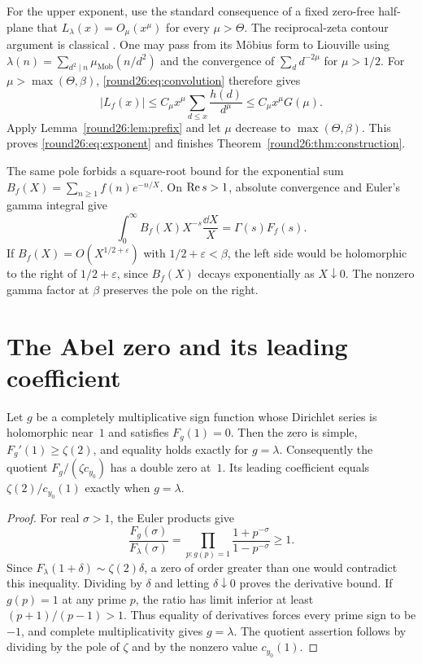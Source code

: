 For the upper exponent, use the standard consequence of a fixed
zero-free half-plane that $L_\lambda(x)=O_\mu(x^\mu)$ for every
$\mu>\Theta$. The reciprocal-zeta contour argument is classical
\cite[Ch.~XIV]{titchmarsh}. One may pass from its M\"obius form to
Liouville using $\lambda(n)=\sum_{d^2\mid n}\mu_{\mathrm{Mob}}(n/d^2)$
and the convergence of $\sum_d d^{-2\mu}$ for $\mu>1/2$.
For $\mu>\max(\Theta,\beta)$, \eqref{round26:eq:convolution} therefore gives
\[
 |L_f(x)|\le C_\mu x^\mu\sum_{d\le x}\frac{h(d)}{d^\mu}
          \le C_\mu x^\mu G(\mu).
\]
Apply Lemma~\ref{round26:lem:prefix} and let $\mu$ decrease to
$\max(\Theta,\beta)$. This proves \eqref{round26:eq:exponent} and finishes
Theorem~\ref{round26:thm:construction}.

The same pole forbids a square-root bound for the exponential sum
$B_f(X)=\sum_{n\ge1}f(n)e^{-n/X}$. On $\operatorname{Re} s>1$, absolute convergence
and Euler's gamma integral give
\[
 \int_0^\infty B_f(X)X^{-s}\frac{\dd X}{X}=\Gamma(s)F_f(s).
\]
If $B_f(X)=O(X^{1/2+\varepsilon})$ with $1/2+\varepsilon<\beta$,
the left side would be holomorphic to the right of
$1/2+\varepsilon$, since $B_f(X)$ decays exponentially as $X\downarrow0$.
The nonzero gamma factor at $\beta$ preserves the pole on the right.

\section{The Abel zero and its leading coefficient}

\begin{proposition}\label{round26:prop:slope}
Let $g$ be a completely multiplicative sign function whose Dirichlet
series is holomorphic near~$1$ and satisfies $F_g(1)=0$. Then the zero
is simple, $F_g'(1)\ge\zeta(2)$, and equality holds exactly for $g=\lambda$.
Consequently the quotient $F_g/(\zeta c_{y_0})$ has a double zero at~$1$.
Its leading coefficient equals $\zeta(2)/c_{y_0}(1)$ exactly when
$g=\lambda$.
\end{proposition}
\begin{proof}
For real $\sigma>1$, the Euler products give
\[
 \frac{F_g(\sigma)}{F_\lambda(\sigma)}
   =\prod_{p:g(p)=1}\frac{1+p^{-\sigma}}{1-p^{-\sigma}}\ge1.
\]
Since $F_\lambda(1+\delta)\sim\zeta(2)\delta$, a zero of order
greater than one would contradict this inequality. Dividing by
$\delta$ and letting $\delta\downarrow0$ proves the derivative bound.
If $g(p)=1$ at any prime $p$, the ratio has limit inferior at least
$(p+1)/(p-1)>1$. Thus equality of derivatives forces every prime sign
to be $-1$, and complete multiplicativity gives $g=\lambda$.
The quotient assertion follows by dividing by the pole of $\zeta$
and by the nonzero value $c_{y_0}(1)$.
\end{proof}

